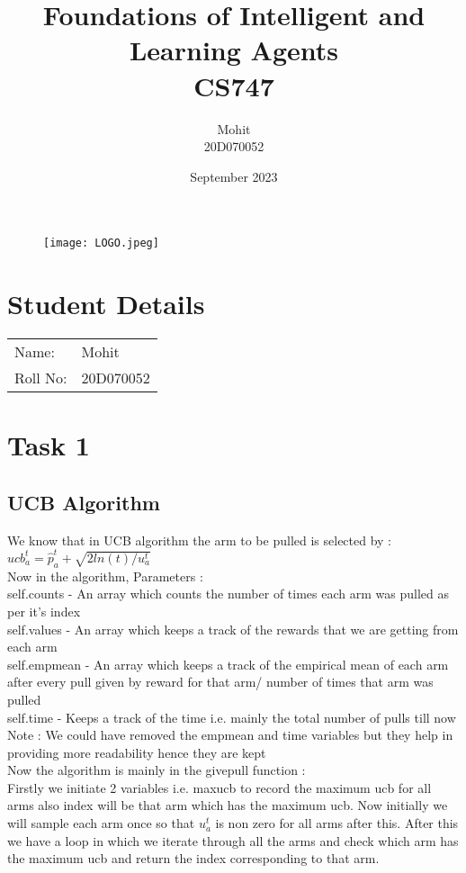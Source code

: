 \documentclass{article}
\title{Foundations of Intelligent and Learning Agents\\CS747}
\author{Mohit\\20D070052 }
\date{September 2023}
\begin{document}
\maketitle
\begin{figure}[H]
\begin{center}
\texttt{[image: LOGO.jpeg]}
\end{center}
\end{figure}
\section{Student Details}
\begin{tabular}{ l l  }
 Name: & Mohit \\ 
 Roll No: & 20D070052  \\  
\end{tabular}

\newpage

\section{Task 1}


\subsection{UCB Algorithm}
We know that in UCB algorithm the arm to be pulled is selected by :\\

$ucb_a^t = \hat{p}_a^t + \sqrt{2ln(t)/u_a^t}$ \\

Now in the algorithm, Parameters : \\
self.counts - An array which counts the number of times each arm was pulled as per it's index\\
self.values - An array which keeps a track of the rewards that we are getting from each arm\\
self.empmean - An array which keeps a track of the empirical mean of each arm after every pull given by reward for that arm/ number of times that arm was pulled\\
self.time - Keeps a track of the time i.e. mainly the total number of pulls till now \\

Note : We could have removed the empmean and time variables but they help in providing more readability hence they are kept \\

Now the algorithm is mainly in the givepull function :\\
Firstly we initiate 2 variables i.e. maxucb to record the maximum ucb for all arms also index will be that arm which has the maximum ucb. Now initially we will sample each arm once so that $u_a^t$ is non zero for all arms after this. After this we have a loop in which we iterate through all the arms and check which arm has the maximum ucb and return the index corresponding to that arm.\\
\end{document}
